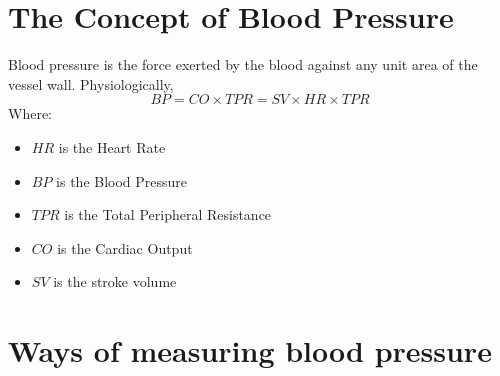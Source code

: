 \documentclass[
  letterpaper,
  DIV=11,
  numbers=noendperiod]{scrreprt}
\providecommand{\tightlist}{%
  \setlength{\itemsep}{0pt}\setlength{\parskip}{0pt}}\usepackage{longtable,booktabs,array}
\begin{document}
\hypertarget{the-concept-of-blood-pressure}{%
\section{The Concept of Blood
Pressure}\label{the-concept-of-blood-pressure}}

Blood pressure is the force exerted by the blood against any unit area
of the vessel wall. Physiologically,
\[BP = CO \times TPR = SV \times HR \times TPR\] Where:

\begin{itemize}
\tightlist
\item
  \(HR\) is the Heart Rate
\item
  \(BP\) is the Blood Pressure
\item
  \(TPR\) is the Total Peripheral Resistance
\item
  \(CO\) is the Cardiac Output
\item
  \(SV\) is the stroke volume
\end{itemize}

\hypertarget{ways-of-measuring-blood-pressure}{%
\section{Ways of measuring blood
pressure}\label{ways-of-measuring-blood-pressure}}
\end{document}
